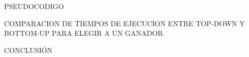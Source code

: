 \documentclass[./main.tex]{subfiles}
\begin{document}
PSEUDOCODIGO
\newline

COMPARACION DE TIEMPOS DE EJECUCION ENTRE TOP-DOWN Y BOTTOM-UP PARA ELEGIR A UN GANADOR.
\newline

CONCLUSI\'ON

\end{document}

